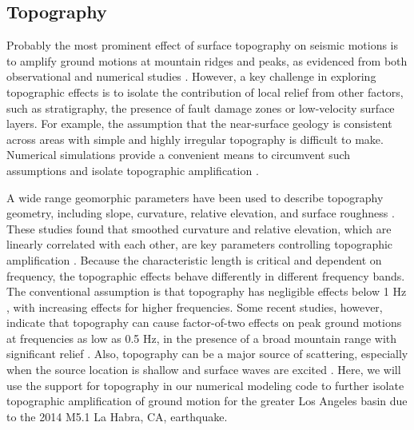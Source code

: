 \subsection{Topography}
Probably the most prominent effect of surface topography on seismic motions is to amplify ground motions at mountain ridges and peaks, as evidenced from both observational and numerical studies \citep{celebiTopographicalGeologicalAmplifications1987,kawaseTopographyEffectCritical1990,massaExperimentalApproachEstimating2010,burjanekEmpiricalEvidenceLocal2014}. However, a key challenge in exploring topographic effects is to isolate the contribution of local relief from other factors, such as stratigraphy, the presence of fault damage zones or low-velocity surface layers. For example, the assumption that the near-surface geology is consistent across areas with simple and highly irregular topography  \citep{celebiTopographicalGeologicalAmplifications1987,geliEffectTopographyEarthquake1988,chavez-garciaComplexSiteEffects2000} is difficult to make. Numerical simulations provide a convenient means to circumvent such assumptions and isolate topographic ampliﬁcation \citep{booreNoteEffectSimple1972,sanchez-sesmaDiffractionSVRayleigh1991,lovati2011estimation,hartzellGroundMotionPresence2017}.

 A wide range geomorphic parameters have been used to describe topography geometry, including slope, curvature, relative elevation, and surface roughness \citep{ashfordAnalysisTopographicAmplification1997,nguyenEvaluationSeismicGround2007,bouckovalasNumericalEvaluationSlope2005}. These studies found that smoothed curvature and relative elevation, which are linearly correlated with each other, are key parameters controlling topographic amplification \citep{maufroyFrequencyScaledCurvature2015,raiEmpiricalTerrainBasedTopographic2017}. Because the characteristic length is critical and dependent on frequency, the topographic effects behave differently in different frequency bands. The conventional assumption is that topography has negligible effects below 1 Hz \citep{booreNoteEffectSimple1972, pischiuttaTopographicEffectsHill2010}, with increasing effects for higher frequencies. Some recent studies, however, indicate that topography can cause factor-of-two effects on peak ground motions at frequencies as low as 0.5 Hz, in the presence of a broad mountain range with significant relief . Also, topography can be a major source of scattering, especially when the source location is shallow and surface waves are excited \citep{leeEffectsTopographySeismicWave2009, imperatoriRoleTopographyLateral2015}. Here, we will use the support for topography in our numerical modeling code to further isolate topographic amplification of ground motion for the greater Los Angeles basin due to the 2014 M5.1 La Habra, CA, earthquake.


